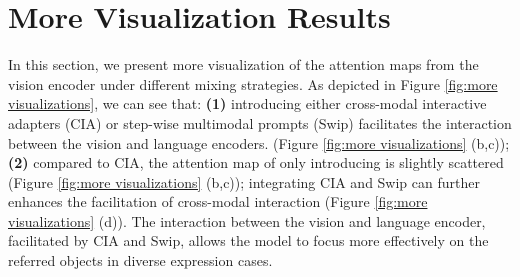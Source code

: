 \section{More Visualization Results}
\label{sec:more vis}

In this section, we present more visualization of the attention maps from the vision encoder under different mixing strategies. As depicted in Figure \ref{fig:more visualizations}, we can see that: \textbf{(1)} introducing either cross-modal interactive adapters (CIA) or step-wise multimodal prompts (Swip) facilitates the interaction between the vision and language encoders. (Figure \ref{fig:more visualizations} (b,c)); \textbf{(2)} compared to CIA, the attention map of only introducing is slightly scattered (Figure \ref{fig:more visualizations} (b,c)); 
integrating CIA and Swip can further enhances the facilitation of cross-modal interaction (Figure \ref{fig:more visualizations} (d)). The interaction between the vision and language encoder, facilitated by CIA and Swip, allows the model to focus more effectively on the referred objects in diverse expression cases. 







